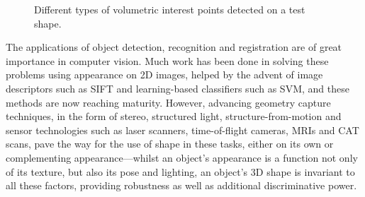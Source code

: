\begin{figure}[ht]
{}
\hspace{-3.5mm}
\hspace{-3.5mm}
\caption{\label{fig:testshapes}Different types of volumetric interest points detected on a test shape.}
\end{figure}

The applications of object detection, recognition and registration are of great importance in computer vision. Much work has been done in solving these problems using appearance on 2D images, helped by the advent of image descriptors such as SIFT and learning-based classifiers such as SVM, and these methods are now reaching maturity. However, advancing geometry capture techniques, in the form of stereo, structured light, structure-from-motion and sensor technologies such as laser scanners, time-of-flight cameras, MRIs and CAT scans, pave the way for the use of shape in these tasks, either on its own or complementing appearance---whilst an object's appearance is a function not only of its texture, but also its pose and lighting, an object's 3D shape is invariant to all these factors, providing robustness as well as additional discriminative power.

